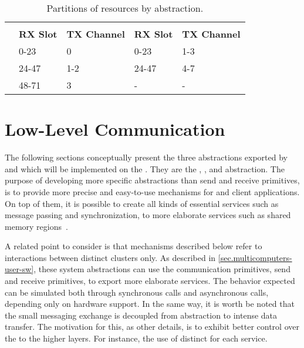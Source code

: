 		\begin{table}[!tb]
			\centering%
			\caption{Partitions of \noc resources by abstraction.}%
			\label{tab.noc-resources}%

			\begin{tabular}{l|l|l|l|l|}
				\cline{2-5}
														& \multicolumn{2}{c|}{\textbf{\cnoc}}    & \multicolumn{2}{c|}{\textbf{\dnoc}}    \\ \cline{2-5}
														& \textbf{RX Slot} & \textbf{TX Channel} & \textbf{RX Slot} & \textbf{TX Channel} \\ \hline
				\multicolumn{1}{|l|}{\textbf{\mailbox}} & 0-23             & 0                   & 0-23             & 1-3                 \\ \hline
				\multicolumn{1}{|l|}{\textbf{\portal}}  & 24-47            & 1-2                 & 24-47            & 4-7                 \\ \hline
				\multicolumn{1}{|l|}{\textbf{\sync}}    & 48-71            & 3                   & -                & -                   \\ \hline
			\end{tabular}

		\end{table}

	\section{Low-Level Communication}
	\label{sec.low-level-comm}

		The following sections conceptually present the three abstractions
		exported by \hal and which will be implemented on the \mppa.
		They are the \sync, \mailbox, and \portal abstraction.
		The purpose of developing more specific abstractions than
		send and receive primitives, is to provide more precise and easy-to-use
		mechanisms for \os and client applications.
		On top of them, it is possible to create all kinds of essential
		services such as message passing and synchronization,
		to more elaborate services such as shared memory regions~\cite{penna:rmen}.

		A related point to consider is that mechanisms described below refer
		to interactions between distinct clusters only.
		As described in \autoref{sec.multicomputers-user-sw}, these system
		abstractions can use the communication primitives, \ie send and receive
		primitives, to export more elaborate services.
		The behavior expected can be simulated both through synchronous calls
		and asynchronous calls, depending only on hardware support.
		In the same way, it is worth be noted that the small messaging exchange
		is decoupled from abstraction to intense data transfer.
		The motivation for this, as other details, is to exhibit better control
		over the \qos to the higher layers.
		For instance, the use of distinct \nocs for each service.

